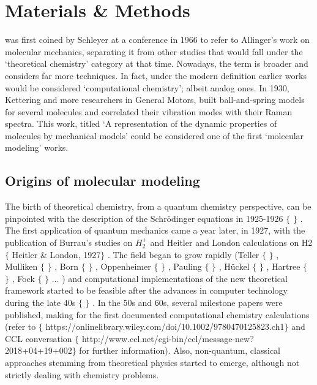 \chapter{Materials \& Methods}
\label{chap:02}

 was first coined by Schleyer at a conference in 1966 to refer to Allinger’s work on molecular mechanics, separating it from other studies that would fall under the ‘theoretical chemistry’ category at that time. Nowadays, the term is broader and considers far more techniques. In fact, under the modern definition earlier works would be considered ‘computational chemistry’; albeit analog ones. In 1930, Kettering and more researchers in General Motors, built ball-and-spring models for several molecules and correlated their vibration modes with their Raman spectra. This work, titled ‘A representation of the dynamic properties of molecules by mechanical models’ could be considered one of the first ‘molecular modeling’ works.

\section{Origins of molecular modeling}
The birth of theoretical chemistry, from a quantum chemistry perspective, can be pinpointed with the description of the Schrödinger equations in 1925-1926 $ \{ $ $ \} $ . The first application of quantum mechanics came a year later, in 1927, with the publication of Burrau’s studies on $H_{2}^{+}$\cite{burrau1927} and Heitler and London calculations on H2 $ \{ $ Heitler $\&$  London, 1927$ \} $ . The field began to grow rapidly (Teller $ \{ $ $ \} $ , Mulliken $ \{ $ $ \} $ , Born $ \{ $ $ \} $ , Oppenheimer $ \{ $ $ \} $ , Pauling $ \{ $ $ \} $ , Hückel $ \{ $ $ \} $ , Hartree $ \{ $ $ \} $ , Fock $ \{ $ $ \} $ $ \ldots $ ) and computational implementations of the new theoretical framework started to be feasible after the advances in computer technology during the late 40s $ \{ $ $ \} $ . In the 50s and 60s, several milestone papers were published, making for the first documented computational chemistry calculations (refer to $ \{ $ https://onlinelibrary.wiley.com/doi/10.1002/9780470125823.ch1$ \} $  and CCL conversation $ \{ $ http://www.ccl.net/cgi-bin/ccl/message-new?2018+04+19+002$ \} $  for further information). Also, non-quantum, classical approaches stemming from theoretical physics started to emerge, although not strictly dealing with chemistry problems. \cite{Alder1959,Gibson1960,Rahman1964}

